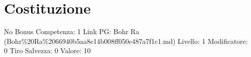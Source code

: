 \section{Costituzione}\label{costituzione}

\begin{description}
\tightlist
\item[Tags: STAT]
No Bonus Competenza: 1 Link PG: Bohr Ra
(Bohr\%20Ra\%2066940b5aa8e14b008ff050e487a7f1c1.md) Livello: 1
Modificatore: 0 Tiro Salvezza: 0 Valore: 10
\end{description}
